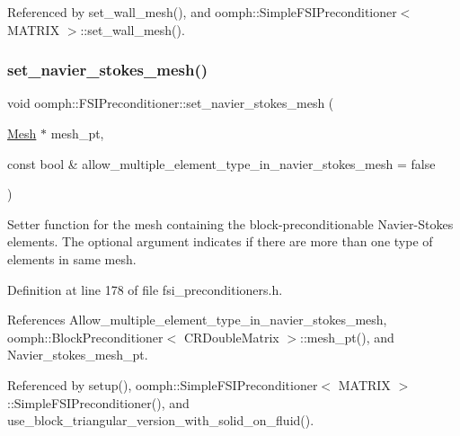 Referenced by set\+\_\+wall\+\_\+mesh(), and oomph\+::\+Simple\+F\+S\+I\+Preconditioner$<$ M\+A\+T\+R\+I\+X $>$\+::set\+\_\+wall\+\_\+mesh().

\mbox{\label{classoomph_1_1FSIPreconditioner_a5d70612246bd08bec6c7b373da5e9c80}} 
\subsubsection{\texorpdfstring{set\+\_\+navier\+\_\+stokes\+\_\+mesh()}{set\_navier\_stokes\_mesh()}}
{\footnotesize\ttfamily void oomph\+::\+F\+S\+I\+Preconditioner\+::set\+\_\+navier\+\_\+stokes\+\_\+mesh (\begin{DoxyParamCaption}\item[{\hyperlink{classoomph_1_1Mesh}{Mesh} $\ast$}]{mesh\+\_\+pt,  }\item[{const bool \&}]{allow\+\_\+multiple\+\_\+element\+\_\+type\+\_\+in\+\_\+navier\+\_\+stokes\+\_\+mesh = {\ttfamily false} }\end{DoxyParamCaption})\hspace{0.3cm}{\ttfamily [inline]}}



Setter function for the mesh containing the block-\/preconditionable Navier-\/\+Stokes elements. The optional argument indicates if there are more than one type of elements in same mesh. 



Definition at line 178 of file fsi\+\_\+preconditioners.\+h.



References Allow\+\_\+multiple\+\_\+element\+\_\+type\+\_\+in\+\_\+navier\+\_\+stokes\+\_\+mesh, oomph\+::\+Block\+Preconditioner$<$ C\+R\+Double\+Matrix $>$\+::mesh\+\_\+pt(), and Navier\+\_\+stokes\+\_\+mesh\+\_\+pt.



Referenced by setup(), oomph\+::\+Simple\+F\+S\+I\+Preconditioner$<$ M\+A\+T\+R\+I\+X $>$\+::\+Simple\+F\+S\+I\+Preconditioner(), and use\+\_\+block\+\_\+triangular\+\_\+version\+\_\+with\+\_\+solid\+\_\+on\+\_\+fluid().

\mbox{\label{classoomph_1_1FSIPreconditioner_a0f21e38e18521e0946c3f3ec98a85baa}} 
